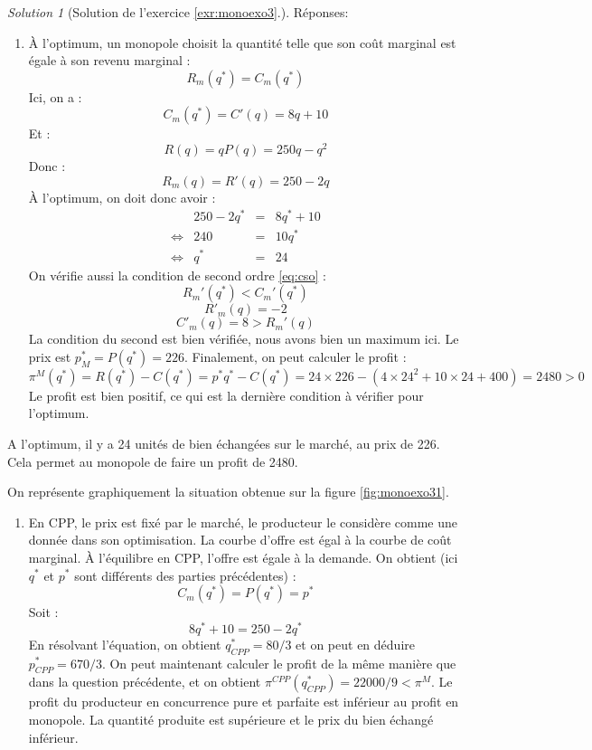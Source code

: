 \documentclass[
]{book}
\providecommand{\tightlist}{%
  \setlength{\itemsep}{0pt}\setlength{\parskip}{0pt}}
\theoremstyle{definition}
\theoremstyle{definition}
\theoremstyle{definition}
\theoremstyle{definition}
\theoremstyle{remark}
\newtheorem*{solution}{Solution}
\begin{document}
\begin{solution}[Solution de l'exercice  \ref{exr:monoexo3}.]

Réponses:

\begin{enumerate}
\def\labelenumi{\arabic{enumi}.}
\tightlist
\item
  À l'optimum, un monopole choisit la quantité telle que son coût marginal est égale à son revenu marginal :
  \[R_m(q^*)=C_m(q^*)\]
  Ici, on a :
  \[C_m(q^*)=C'(q)=8q+10\]
  Et :
  \[R(q) =qP(q)=250q-q^2\]
  Donc :
  \[R_m(q)=R'(q)=250-2q\]
  À l'optimum, on doit donc avoir :
  \[
  \begin{array}{crcl}
  &250-2q^*&=&8q^*+10\\
  \Leftrightarrow & 240&=&10q^*\\
  \Leftrightarrow & q^*&=&24
  \end{array}
  \]
  On vérifie aussi la condition de second ordre \eqref{eq:cso} :
  \[R_m'(q^*)<C_m'(q^*)\]
  \[R'_m(q)=-2\]
  \[C'_m(q)=8>R_m'(q)\]
  La condition du second est bien vérifiée, nous avons bien un maximum ici.
  Le prix est \(p^*_M=P(q^*)=226\).
  Finalement, on peut calculer le profit :
  \[
  \pi^M(q^*)=R(q^*)-C(q^*)=p^*q^*-C(q^*)=24\times226-(4\times24^2+10\times24+400)=2480>0
  \]
  Le profit est bien positif, ce qui est la dernière condition à vérifier pour l'optimum.
\end{enumerate}

A l'optimum, il y a 24 unités de bien échangées sur le marché, au prix de 226.
Cela permet au monopole de faire un profit de 2480.

On représente graphiquement la situation obtenue sur la figure \ref{fig:monoexo31}.

\begin{enumerate}
\def\labelenumi{\arabic{enumi}.}
\setcounter{enumi}{1}
\tightlist
\item
  En CPP, le prix est fixé par le marché, le producteur le considère comme une donnée dans son optimisation.
  La courbe d'offre est égal à la courbe de coût marginal.
  À l'équilibre en CPP, l'offre est égale à la demande.
  On obtient (ici \(q^*\) et \(p^*\) sont différents des parties précédentes) :
  \[C_m(q^*)=P(q^*)=p^*\]
  Soit :
  \[8q^*+10=250-2q^*\]
  En résolvant l'équation, on obtient \(q^*_{CPP}=80/3\) et on peut en déduire \(p^*_{CPP}=670/3\).
  On peut maintenant calculer le profit de la même manière que dans la question précédente, et on obtient \(\pi^{CPP}(q^*_{CPP})=22000/9<\pi^M\).
  Le profit du producteur en concurrence pure et parfaite est inférieur au profit en monopole.
  La quantité produite est supérieure et le prix du bien échangé inférieur.
\end{enumerate}


\end{solution}
\end{document}
